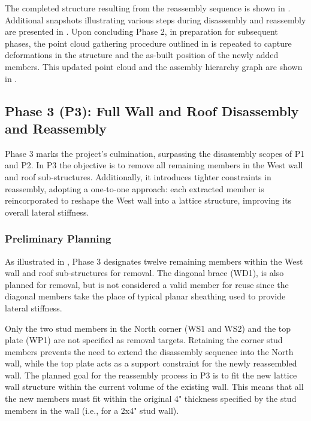     The completed structure resulting from the reassembly sequence is shown in . Additional snapshots illustrating various steps during disassembly and reassembly are presented in . Upon concluding Phase 2, in preparation for subsequent phases, the point cloud gathering procedure outlined in  is repeated to capture deformations in the structure and the as-built position of the newly added members. This updated point cloud and the assembly hierarchy graph are shown in .




\clearpage
\subsection{Phase 3 (P3): Full Wall and Roof Disassembly and Reassembly}
    
   Phase 3 marks the project's culmination, surpassing the disassembly scopes of P1 and P2. In P3 the objective is to remove all remaining members in the West wall and roof sub-structures. Additionally, it introduces tighter constraints in reassembly, adopting a one-to-one approach: each extracted member is reincorporated to reshape the West wall into a lattice structure, improving its overall lateral stiffness.

\subsubsection{Preliminary Planning}
    As illustrated in , Phase 3 designates twelve remaining members within the West wall and roof sub-structures for removal. The diagonal brace (WD1), is also planned for removal, but is not considered a valid member for reuse since the diagonal members take the place of typical planar sheathing used to provide lateral stiffness.
    
    Only the two stud members in the North corner (WS1 and WS2) and the top plate (WP1) are not specified as removal targets. Retaining the corner stud members prevents the need to extend the disassembly sequence into the North wall, while the top plate acts as a support constraint for the newly reassembled wall. The planned goal for the reassembly process in P3 is to fit the new lattice wall structure within the current volume of the existing wall. This means that all the new members must fit within the original 4" thickness specified by the stud members in the wall (i.e., for a 2x4" stud wall).

